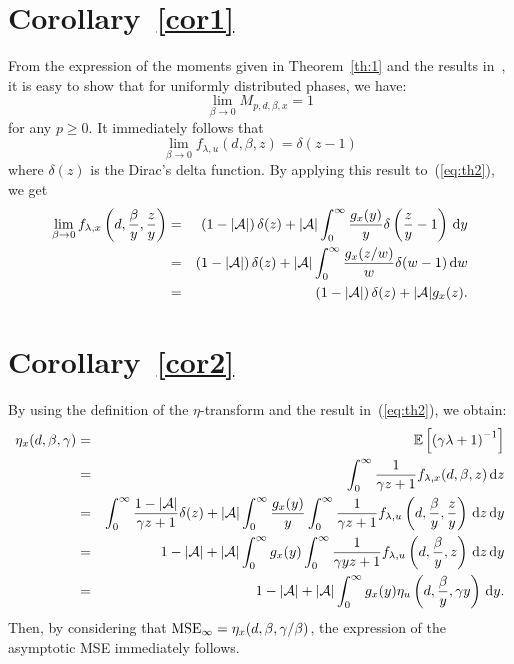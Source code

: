 \documentclass[11pt, draftcls, onecolumn, a4paper]{IEEEtran}
\def\MSEinf{{\rm MSE}_{\infty}}
\newcommand{\Ac}{{\cal A}}
\def\non{\nonumber\\}
\begin{document}
\section{Corollary~\ref{cor1}}
\label{app:cor1}
From the expression of the moments given in Theorem~\ref{th:1} and the
results in~\cite{TSP2}, it is easy to show that for uniformly
distributed phases, we have:
\[ \lim_{\beta\rightarrow 0} M_{p,d,\beta,x} = 1\]
for any $p \ge 0$. It immediately follows that 
\[ \lim_{\beta\rightarrow 0}f_{\lambda,u}(d,\beta,z) = \delta(z-1) \]
where $\delta(z)$ is the Dirac's delta function. By applying this
result to~(\ref{eq:th2}), we get
\begin{eqnarray}
\lim_{\beta\rightarrow 0}f_{\lambda,x}\left(d,\frac{\beta}{y},\frac{z}{y}\right) 
&=& \left(1-|\Ac|\right)\delta(z)+ |\Ac| \int_{0}^{\infty}\frac{g_x(y)}{y}\delta\left(\frac{z}{y}-1\right)\dd y \non
&=& \left(1-|\Ac|\right)\delta(z)+ |\Ac| \int_{0}^{\infty}\frac{g_x(z/w)}{w}\delta(w-1)\dd w \non
&=& \left(1-|\Ac|\right)\delta(z)+ |\Ac| g_x(z)  .
\label{eq:distribution_psi3}
\end{eqnarray}

\section{Corollary~\ref{cor2}}
\label{app:cor2}
By using the definition of the $\eta$-transform and the result
in~(\ref{eq:th2}), we  obtain:
\begin{eqnarray}
\eta_{x}(d,\beta,\gamma) 
&=& \EE\left[\left(\gamma\lambda+1\right)^{-1}\right] \non
&=& \int_0^{\infty} \frac{1}{\gamma z+1}f_{\lambda,x}(d,\beta,z) \dd z \non
&=& \int_0^{\infty} \frac{1-|\Ac|}{\gamma z+1}\delta(z) 
    + |\Ac| \int_0^{\infty}\frac{g_x(y)}{y} \int_0^{\infty }\frac{1}{\gamma z+1}f_{\lambda,u}\left(d,\frac{\beta}{y},\frac{z}{y}\right)\dd z \dd y \non
&=& 1-|\Ac|+ |\Ac| \int_0^{\infty} g_x(y) \int_0^{\infty }\frac{1}{\gamma y z+1}f_{\lambda,u}\left(d,\frac{\beta}{y}, z\right)\dd z \dd y \non
&=& 1-|\Ac|+ |\Ac| \int_0^{\infty} g_x(y) \eta_u\left(d,\frac{\beta}{y}, \gamma y\right) \dd y .
\end{eqnarray}
Then, by considering that $\MSEinf = \eta_{x}(d,\beta,\gamma/\beta)$, 
the expression of the asymptotic MSE 
immediately follows. 
\end{document}
